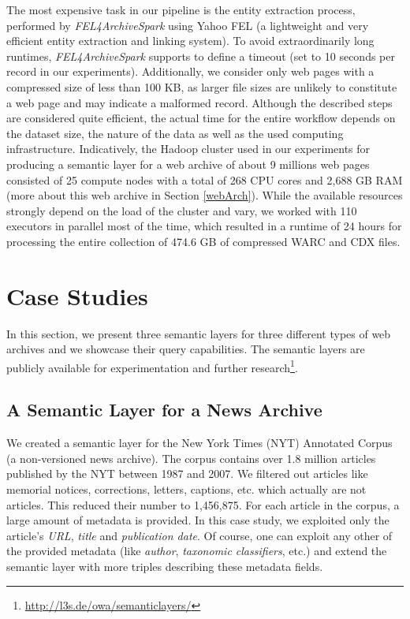 \documentclass[twocolumn]{svjour3}
\begin{document}
The most expensive task in our pipeline is the entity extraction process,
performed by {\em FEL4ArchiveSpark} using Yahoo FEL \cite{BlancoWSDM2015}
(a lightweight and very efficient entity extraction and linking system).
To avoid extraordinarily long runtimes,
{\em FEL4ArchiveSpark} supports to define a timeout
(set to 10 seconds per record in our experiments).
Additionally, we consider only web pages with a compressed size of less than 100 KB,
as larger file sizes are unlikely to constitute a web page and may indicate a malformed record.
Although the described steps are considered quite efficient,
the actual time for the entire workflow depends on the dataset size,
the nature of the data as well as the used computing infrastructure.
Indicatively, the Hadoop cluster used in our experiments for
producing a semantic layer for a web archive
of about 9 millions web pages
consisted of 25 compute nodes
with a total of 268 CPU cores and 2,688 GB RAM (more about this web archive in Section \ref{webArch}).
While the available resources strongly depend on
the load of the cluster and vary,
we worked with 110 executors in parallel most of the time,
which resulted in a runtime of 24 hours for
processing the entire collection of 474.6 GB of compressed WARC and CDX files.



\section{Case Studies}
\label{sec:casestudies}

In this section, we present three semantic layers
for three different types of web archives
and we showcase their query capabilities.
The semantic layers are publicly
available for experimentation and further research\footnote{\url{http://l3s.de/owa/semanticlayers/}}.

\subsection{A Semantic Layer for a News Archive}
\label{newsArch}
We created a semantic layer for the
New York Times (NYT) Annotated Corpus \cite{sandhaus2008new}
(a non-versioned news archive).
The corpus contains over 1.8 million articles published by
the NYT between 1987 and 2007.
We filtered out articles like memorial notices, corrections,
letters, captions, etc. which actually are not articles.
This reduced their number to 1,456,875.
For each article in the corpus,
a large amount of metadata is provided.
In this case study, we exploited only the article's {\em URL},
{\em title} and {\em publication date}.
Of course, one can exploit any other
of the provided metadata (like {\em author},
{\em taxonomic classifiers}, etc.) and extend the
semantic layer with more triples describing these metadata fields.
\end{document}
